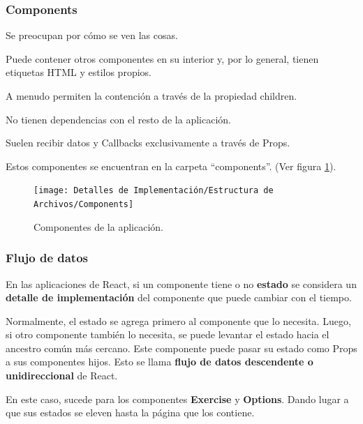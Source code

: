 \documentclass[12pt,twoside,titlepage]{report}
\begin{document}
\subsubsection{Components}

\begin{compactitem}
    \item Se preocupan por cómo se ven las cosas.
    \item Puede contener otros componentes en su interior y, por lo general, tienen etiquetas HTML y estilos propios.
    \item A menudo permiten la contención a través de la propiedad children.
    \item No tienen dependencias con el resto de la aplicación.
    \item Suelen recibir datos y Callbacks exclusivamente a través de Props.
    \item Estos componentes se encuentran en la carpeta ``components''. (Ver figura \ref{fig:Components}).
\end{compactitem}

\begin{figure}[H]
    \centering
    \texttt{[image: Detalles de Implementación/Estructura de Archivos/Components]}
    \caption{Componentes de la aplicación.}
    \label{fig:Components}
\end{figure}

\subsubsection{Flujo de datos}

En las aplicaciones de React, si un componente tiene o no \textbf{estado} se considera un \textbf{detalle de implementación} del componente que puede cambiar con el tiempo.

Normalmente, el estado se agrega primero al componente que lo necesita. Luego, si otro componente también lo necesita, se puede levantar el estado hacia el ancestro común más cercano. Este componente puede pasar su estado como Props a sus componentes hijos. Esto se llama \textbf{flujo de datos descendente o unidireccional} de React. 

En este caso, sucede para los componentes \textbf{Exercise} y \textbf{Options}. Dando lugar a que sus estados se eleven hasta la página que los contiene.
\end{document}
